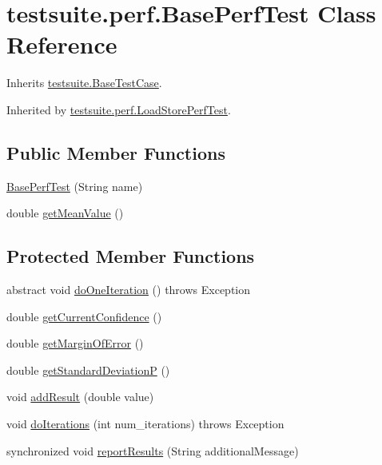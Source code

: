 \hypertarget{classtestsuite_1_1perf_1_1_base_perf_test}{}\section{testsuite.\+perf.\+Base\+Perf\+Test Class Reference}
\label{classtestsuite_1_1perf_1_1_base_perf_test}


Inherits \mbox{\hyperlink{classtestsuite_1_1_base_test_case}{testsuite.\+Base\+Test\+Case}}.



Inherited by \mbox{\hyperlink{classtestsuite_1_1perf_1_1_load_store_perf_test}{testsuite.\+perf.\+Load\+Store\+Perf\+Test}}.

\subsection*{Public Member Functions}
\begin{DoxyCompactItemize}
\item 
\mbox{\hyperlink{classtestsuite_1_1perf_1_1_base_perf_test_a31aa6418a4c1089b614c41ea0b9bd924}{Base\+Perf\+Test}} (String name)
\item 
double \mbox{\hyperlink{classtestsuite_1_1perf_1_1_base_perf_test_a27382fb187f93da07deaa8b4ce1cc3e9}{get\+Mean\+Value}} ()
\end{DoxyCompactItemize}
\subsection*{Protected Member Functions}
\begin{DoxyCompactItemize}
\item 
abstract void \mbox{\hyperlink{classtestsuite_1_1perf_1_1_base_perf_test_ac9682520790f17d153ad993c7bdf5bf4}{do\+One\+Iteration}} ()  throws Exception
\item 
double \mbox{\hyperlink{classtestsuite_1_1perf_1_1_base_perf_test_aafbdf56943e217d90ffd87d17c118af1}{get\+Current\+Confidence}} ()
\item 
double \mbox{\hyperlink{classtestsuite_1_1perf_1_1_base_perf_test_a9206b0e839cce6e668eec8c2cd94bc5c}{get\+Margin\+Of\+Error}} ()
\item 
double \mbox{\hyperlink{classtestsuite_1_1perf_1_1_base_perf_test_a72145770043104a1fe0a8a1648044aed}{get\+Standard\+DeviationP}} ()
\item 
void \mbox{\hyperlink{classtestsuite_1_1perf_1_1_base_perf_test_a4949a27d2e0b9c314d12f45128004da2}{add\+Result}} (double value)
\item 
void \mbox{\hyperlink{classtestsuite_1_1perf_1_1_base_perf_test_a5d1d0a1bf44d9feb9603a2c98705c6c6}{do\+Iterations}} (int num\+\_\+iterations)  throws Exception 
\item 
synchronized void \mbox{\hyperlink{classtestsuite_1_1perf_1_1_base_perf_test_a88bddb3492e88ede49a0b70c63dc47b1}{report\+Results}} (String additional\+Message)
\end{DoxyCompactItemize}
